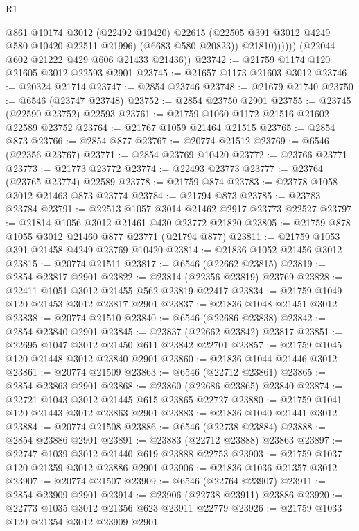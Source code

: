 \begin{lexlean}{R1}
\begin{coremodule}
                    @861
                    @10174
                    @3012
                    (@22492 @10420)
                    @22615
                    (@22505 @391 @3012 @4249 @580 @10420 @22511 @21996)
                    (@6683 @580 @20823))
                  @21810))))))
      (@22044 @602 @21222 @429 @606 @21433 @21436))
@23742 := @21759 @1174 @120 @21605 @3012 @22593 @2901
@23745 := @21657 @1173 @21603 @3012
@23746 := @20324 @21714
@23747 := @2854 @23746
@23748 := @21679 @21740
@23750 := @6546 (@23747 @23748)
@23752 := @2854 @23750 @2901
@23755 := @23745 (@22590 @23752) @22593
@23761 := @21759 @1060 @1172 @21516 @21602 @22589 @23752
@23764 := @21767 @1059 @21464 @21515
@23765 := @2854 @873
@23766 := @2854 @877
@23767 := @20774 @21512
@23769 := @6546 (@22356 @23767)
@23771 := @2854 @23769 @10420
@23772 := @23766 @23771
@23773 := @21773 @23772
@23774 := @22493 @23773
@23777 := @23764 (@23765 @23774) @22589
@23778 := @21759 @874
@23783 := @23778 @1058 @3012 @21463 @873 @23774
@23784 := @21794 @873
@23785 := @23783 @23784
@23791 := @22513 @1057 @3014 @21462 @2917 @23773 @22527
@23797 := @21814 @1056 @3012 @21461 @430 @23772 @21820
@23805 := @21759 @878 @1055 @3012 @21460 @877 @23771 (@21794 @877)
@23811 := @21759 @1053 @391 @21458 @4249 @23769 @10420
@23814 := @21836 @1052 @21456 @3012
@23815 := @20774 @21511
@23817 := @6546 (@22662 @23815)
@23819 := @2854 @23817 @2901
@23822 := @23814 (@22356 @23819) @23769
@23828 := @22411 @1051 @3012 @21455 @562 @23819 @22417
@23834 := @21759 @1049 @120 @21453 @3012 @23817 @2901
@23837 := @21836 @1048 @21451 @3012
@23838 := @20774 @21510
@23840 := @6546 (@22686 @23838)
@23842 := @2854 @23840 @2901
@23845 := @23837 (@22662 @23842) @23817
@23851 := @22695 @1047 @3012 @21450 @611 @23842 @22701
@23857 := @21759 @1045 @120 @21448 @3012 @23840 @2901
@23860 := @21836 @1044 @21446 @3012
@23861 := @20774 @21509
@23863 := @6546 (@22712 @23861)
@23865 := @2854 @23863 @2901
@23868 := @23860 (@22686 @23865) @23840
@23874 := @22721 @1043 @3012 @21445 @615 @23865 @22727
@23880 := @21759 @1041 @120 @21443 @3012 @23863 @2901
@23883 := @21836 @1040 @21441 @3012
@23884 := @20774 @21508
@23886 := @6546 (@22738 @23884)
@23888 := @2854 @23886 @2901
@23891 := @23883 (@22712 @23888) @23863
@23897 := @22747 @1039 @3012 @21440 @619 @23888 @22753
@23903 := @21759 @1037 @120 @21359 @3012 @23886 @2901
@23906 := @21836 @1036 @21357 @3012
@23907 := @20774 @21507
@23909 := @6546 (@22764 @23907)
@23911 := @2854 @23909 @2901
@23914 := @23906 (@22738 @23911) @23886
@23920 := @22773 @1035 @3012 @21356 @623 @23911 @22779
@23926 := @21759 @1033 @120 @21354 @3012 @23909 @2901

\end{coremodule}
\end{lexlean}
